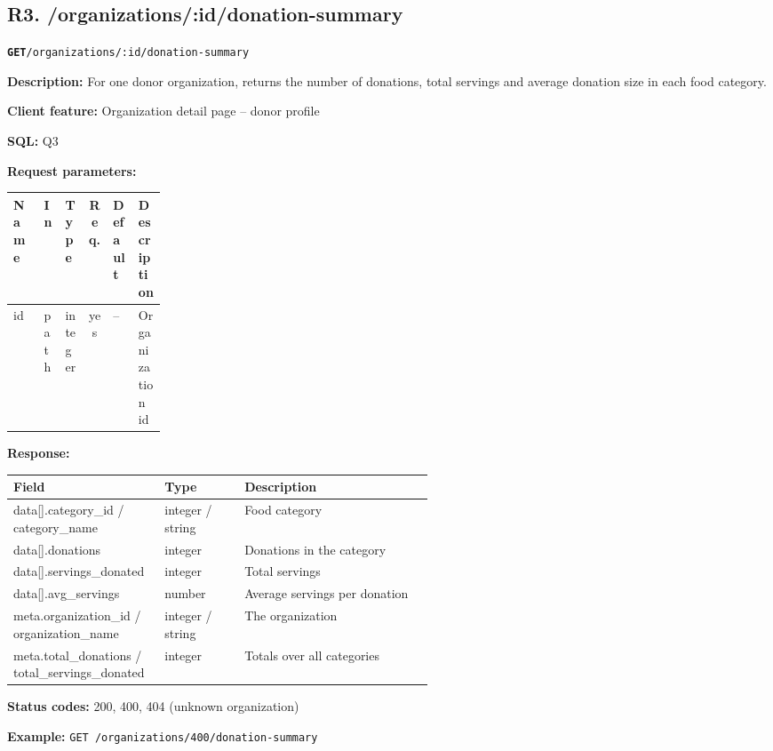 \documentclass[11pt,letterpaper]{article}
\newcommand{\brk}{\penalty0\relax}
\newcommand{\routebar}[2]{%
  \par\noindent\colorbox{boxGray}{\parbox{\dimexpr\linewidth-2\fboxsep}{%
  \strut\textbf{\texttt{#1}}\quad\texttt{#2}\strut}}\par\smallskip}
\newcommand{\kv}[2]{\textbf{#1:} #2\par}
\begin{document}
\subsection*{R3. /organizations/:id/donation-summary}
\routebar{GET}{/organizations/:id/donation-summary}
\kv{Description}{For one donor organization, returns the number of donations, total servings and average donation size in each food category.}
\kv{Client feature}{Organization detail page -- donor profile}
\kv{SQL}{Q3}
\kv{Request parameters}{}
\begin{xltabular}{\linewidth}{>{\ttfamily\raggedright\arraybackslash}p{0.2\linewidth} l l c l >{\raggedright\arraybackslash}X}
\toprule
\textrm{\textbf{Name}} & \textbf{In} & \textbf{Type} & \textbf{Req.} & \textbf{Default} & \textbf{Description} \\
\midrule
id & path & integer & yes & -- & Organization id \\
\bottomrule
\end{xltabular}
\kv{Response}{}
\begin{xltabular}{\linewidth}{>{\ttfamily\raggedright\arraybackslash}p{0.36\linewidth} >{\raggedright\arraybackslash}p{0.19\linewidth} >{\raggedright\arraybackslash}X}
\toprule
\textrm{\textbf{Field}} & \textbf{Type} & \textbf{Description} \\
\midrule
data[].\brk{}category\_id /\brk{} category\_name & integer / string & Food category \\
data[].\brk{}donations & integer & Donations in the category \\
data[].\brk{}servings\_donated & integer & Total servings \\
data[].\brk{}avg\_servings & number & Average servings per donation \\
meta.\brk{}organization\_id /\brk{} organization\_name & integer / string & The organization \\
meta.\brk{}total\_donations /\brk{} total\_servings\_donated & integer & Totals over all categories \\
\bottomrule
\end{xltabular}
\kv{Status codes}{200, 400, 404 (unknown organization)}
{\raggedright\textbf{Example:} {\small \texttt{GET /\brk{}organizations/\brk{}400/\brk{}donation-summary}}\par}
\end{document}
